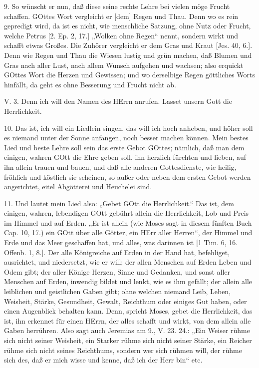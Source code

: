 9. So wünscht er nun, daß diese seine rechte Lehre bei vielen möge Frucht schaffen. GOttes Wort vergleicht er [dem] Regen und Thau. Denn wo es rein gepredigt wird, da ist es nicht, wie menschliche Satzung, ohne Nutz oder Frucht, welche Petrus [2. Ep. 2, 17.] „Wolken ohne Regen“ nennt, sondern wirkt und schafft etwas Großes. Die Zuhörer vergleicht er dem Gras und Kraut [Jes. 40, 6.]. Denn wie Regen und Thau die Wiesen lustig und grün machen, daß Blumen und Gras nach aller Lust, nach allem Wunsch aufgehen und wachsen; also erquickt GOttes Wort die Herzen und Gewissen; und wo derselbige Regen göttliches Worts hinfällt, da geht es ohne Besserung und Frucht nicht ab.

\begin{schriftzitat}
V. 3. Denn ich will den Namen des HErrn anrufen. Lasset unsern Gott die Herrlichkeit.
\end{schriftzitat}

10. Das ist, ich will ein Liedlein singen, das will ich hoch anheben, und höher soll es niemand unter der Sonne anfangen, noch besser machen können. Mein bestes Lied und beste Lehre soll sein das erste Gebot GOttes; nämlich, daß man dem einigen, wahren GOtt die Ehre geben soll, ihn herzlich fürchten und lieben, auf ihn allein trauen und bauen, und daß alle anderen Gottesdienste, wie heilig, fröhlich und köstlich sie scheinen, so außer oder neben dem ersten Gebot werden angerichtet, eitel Abgötterei und Heuchelei sind.

11. Und lautet mein Lied also: „Gebet GOtt die Herrlichkeit.“ Das ist, dem einigen, wahren, lebendigen GOtt gebührt allein die Herrlichkeit, Lob und Preis im Himmel und auf Erden. „Er ist allein (wie Moses sagt in diesem fünften Buch Cap. 10, 17.) ein GOtt über alle Götter, ein HErr aller Herren“, der Himmel und Erde und das Meer geschaffen hat, und alles, was darinnen ist [1 Tim. 6, 16. Offenb. 1, 8.]. Der alle Königreiche auf Erden in der Hand hat, befehliget, ausrichtet, und niedersetzt, wie er will; der allen Menschen auf Erden Leben und Odem gibt; der aller Könige Herzen, Sinne und Gedanken, und sonst aller Menschen auf Erden, inwendig bildet und lenkt, wie es ihm gefällt; der allein alle leiblichen und geistlichen Gaben gibt; ohne welchen niemand Leib, Leben, Weisheit, Stärke, Gesundheit, Gewalt, Reichthum oder einiges Gut haben, oder einen Augenblick behalten kann. Denn, spricht Moses, gebet die Herrlichkeit, das ist, ihn erkennet für einen HErrn, der alles schafft und wirkt, von dem allein alle Gaben herrühren. Also sagt auch Jeremias am 9., V. 23. 24.: „Ein Weiser rühme sich nicht seiner Weisheit, ein Starker rühme sich nicht seiner Stärke, ein Reicher rühme sich nicht seines Reichthums, sondern wer sich rühmen will, der rühme sich des, daß er mich wisse und kenne, daß ich der Herr bin“ etc.

